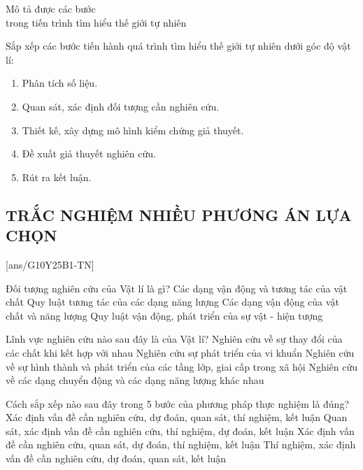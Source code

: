 \begin{dang}{Mô tả được các bước \\trong tiến trình tìm hiểu thế giới tự nhiên}
\end{dang}
\begin{vd}
	Sắp xếp các bước tiến hành quá trình tìm hiểu thế giới tự nhiên dưới góc độ vật lí:
	\begin{enumerate}[label= (\arabic*)]
		\item Phân tích số liệu.
		\item Quan sát, xác định đối tượng cần nghiên cứu.
		\item Thiết kế, xây dựng mô hình kiểm chứng giả thuyết.
		\item Đề xuất giả thuyết nghiên cứu.
		\item Rút ra kết luận.
	\end{enumerate}
\end{vd}
\subsection{TRẮC NGHIỆM NHIỀU PHƯƠNG ÁN LỰA CHỌN}
\setcounter{ex}{0}
[ans/G10Y25B1-TN]
\begin{ex}
	Đối tượng nghiên cứu của Vật lí là gì?
	\choice
	{Các dạng vận động và tương tác của vật chất}
	{Quy luật tương tác của các dạng năng lượng}
	{\True Các dạng vận động của vật chất và năng lượng}
	{Quy luật vận động, phát triển của sự vật - hiện tượng}
	\loigiai{}
\end{ex}

\begin{ex}
	Lĩnh vực nghiên cứu nào sau đây là của Vật lí?
	\choice
	{Nghiên cứu về sự thay đổi của các chất khi kết hợp với nhau}
	{Nghiên cứu sự phát triển của vi khuẩn}
	{Nghiên cứu về sự hình thành và phát triển của các tầng lớp, giai cấp trong xã hội}
	{\True Nghiên cứu về các dạng chuyển động và các dạng năng lượng khác nhau}
	\loigiai{}
\end{ex}

\begin{ex}
	Cách sắp xếp nào sau đây trong 5 bước của phương pháp thực nghiệm là đúng?
	\choice
	{Xác định vấn đề cần nghiên cứu, dự đoán, quan sát, thí nghiệm, kết luận}
	{Quan sát, xác định vấn đề cần nghiên cứu, thí nghiệm, dự đoán, kết luận}
	{\True Xác định vấn đề cần nghiên cứu, quan sát, dự đoán, thí nghiệm, kết luận}
	{Thí nghiệm, xác định vấn đề cần nghiên cứu, dự đoán, quan sát, kết luận}
	\loigiai{}
\end{ex}

